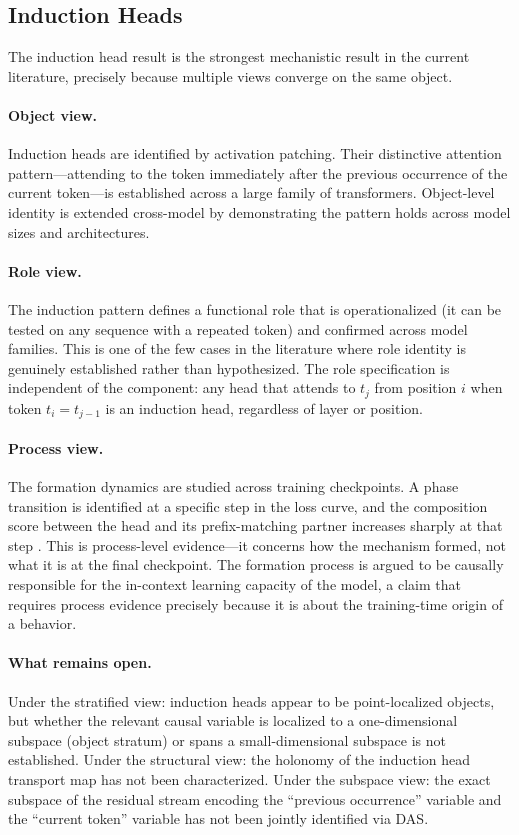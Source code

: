\documentclass[11pt]{article}
\theoremstyle{remark}
\begin{document}
\subsection{Induction Heads}

The induction head result \citep{olsson2022} is the strongest
mechanistic result in the current literature, precisely because multiple
views converge on the same object.

\paragraph{Object view.}
Induction heads are identified by activation patching.  Their distinctive
attention pattern---attending to the token immediately after the previous
occurrence of the current token---is established across a large family
of transformers.  Object-level identity is extended cross-model by
demonstrating the pattern holds across model sizes and architectures.

\paragraph{Role view.}
The induction pattern defines a functional role that is operationalized
(it can be tested on any sequence with a repeated token) and confirmed
across model families.  This is one of the few cases in the literature
where role identity is genuinely established rather than hypothesized.
The role specification is independent of the component: any head that
attends to $t_{j}$ from position $i$ when token $t_i = t_{j-1}$ is an
induction head, regardless of layer or position.

\paragraph{Process view.}
The formation dynamics are studied across training checkpoints.  A
phase transition is identified at a specific step in the loss curve,
and the composition score between the head and its prefix-matching
partner increases sharply at that step \citep{olsson2022}.  This is
process-level evidence---it concerns how the mechanism formed, not
what it is at the final checkpoint.  The formation process is argued
to be causally responsible for the in-context learning capacity of the
model, a claim that requires process evidence precisely because it is
about the training-time origin of a behavior.

\paragraph{What remains open.}
Under the stratified view: induction heads appear to be point-localized
objects, but whether the relevant causal variable is localized to a
one-dimensional subspace (object stratum) or spans a small-dimensional
subspace is not established.  Under the structural view: the holonomy
of the induction head transport map has not been characterized.  Under
the subspace view: the exact subspace of the residual stream encoding
the ``previous occurrence'' variable and the ``current token'' variable
has not been jointly identified via DAS.
\end{document}
